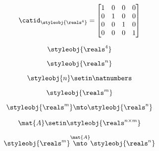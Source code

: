 \begin{forslides}
       
             \begin{equation}
                \label{eq:semicats-slides-118}
                \catid_{\styleobj{\reals^4}} = 
                \begin{bmatrix}
                1 & 0 & 0  & 0   \\
                0 &  1 & 0 & 0 \\
                 0 &0 & 1 & 0 \\
                 0 & 0 & 0&  1 
                \end{bmatrix}
            \end{equation}
            
               
             \begin{equation}
                \label{eq:semicats-slides-119}
                \styleobj{\reals^4}
            \end{equation}
            
         
            
                  \begin{equation}
                \label{eq:semicats-slides-120}
                \styleobj{\reals^n}
            \end{equation}

         
             \begin{equation}
                \label{eq:semicats-slides-121}
                \styleobj{n} \setin \natnumbers
            \end{equation}
            
      
            
             \begin{equation}
                \label{eq:semicats-slides-122}
                 \styleobj{\reals^m}
            \end{equation}
            
            
             \begin{equation}
                \label{eq:semicats-slides-123}
                  \styleobj{\reals^m} \mto \styleobj{\reals^n}
            \end{equation}
            
            
             \begin{equation}
                \label{eq:semicats-slides-124}
                \mat{A} \setin \styleobj{\reals^{n \times m}} 
            \end{equation}
                         
            
             \begin{equation}
                \label{eq:semicats-slides-125}
                \styleobj{\reals^m} \overset{\mat{A}}{\mto} \styleobj{\reals^n}
            \end{equation}
            

\end{forslides}
